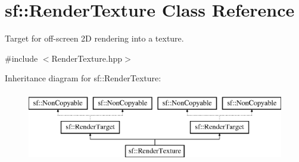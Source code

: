 \hypertarget{classsf_1_1_render_texture}{\section{sf\-:\-:Render\-Texture Class Reference}
\label{classsf_1_1_render_texture}
}


Target for off-\/screen 2\-D rendering into a texture.  




{\ttfamily \#include $<$Render\-Texture.\-hpp$>$}

Inheritance diagram for sf\-:\-:Render\-Texture\-:\begin{figure}[H]
\begin{center}
\leavevmode
\includegraphics[height=3.000000cm]{classsf_1_1_render_texture}
\end{center}
\end{figure}
